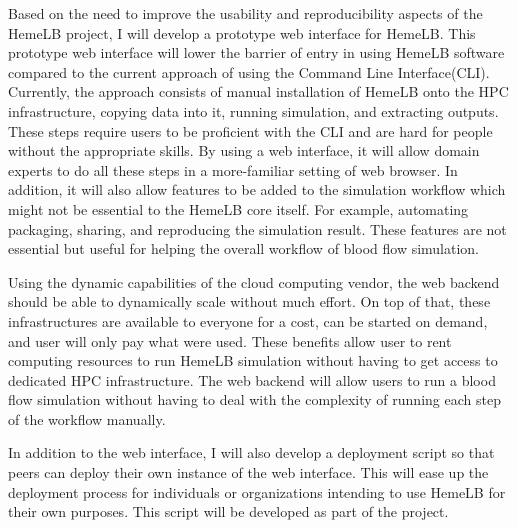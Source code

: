 Based on the need to improve the usability and reproducibility aspects of the HemeLB project, I will develop a prototype web interface for HemeLB. This prototype web interface will lower the barrier of entry in using HemeLB software compared to the current approach of using the Command Line Interface(CLI). Currently, the approach consists of manual installation of HemeLB onto the HPC infrastructure, copying data into it, running simulation, and extracting outputs. These steps require users to be proficient with the CLI and are hard for people without the appropriate skills.  By using a web interface, it will allow domain experts to do all these steps in a more-familiar setting of web browser. In addition, it will also allow features to be added to the simulation workflow which might not be essential to the HemeLB core itself. For example, automating packaging, sharing, and reproducing the simulation result. These features are not essential but useful for helping the overall workflow of blood flow simulation.

Using the dynamic capabilities of the cloud computing vendor, the web backend should be able to dynamically scale without much effort. On top of that, these infrastructures are available to everyone for a cost, can be started on demand, and user will only pay what were used. These benefits allow user to rent computing resources to run HemeLB simulation without having to get access to dedicated HPC infrastructure. The web backend will allow users to run a blood flow simulation without having to deal with the complexity of running each step of the workflow manually.

In addition to the web interface, I will also develop a deployment script so that peers can deploy their own instance of the web interface. This will ease up the deployment process for individuals or organizations intending to use HemeLB for their own purposes. This script will be developed as part of the project.



